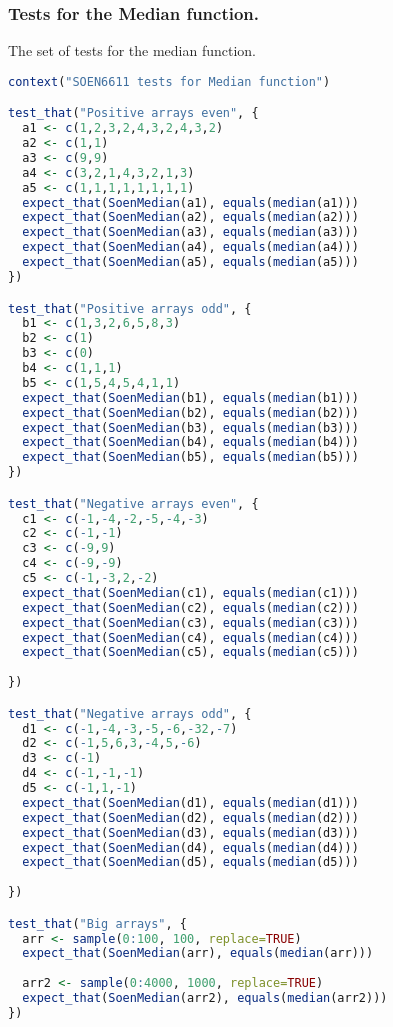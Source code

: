 \documentclass[12pt]{article}
\begin{document}
\subsubsection{Tests for the Median function.}
The set of tests for the median function.
\begin{lstlisting}[language=R]
context("SOEN6611 tests for Median function")

test_that("Positive arrays even", {
  a1 <- c(1,2,3,2,4,3,2,4,3,2)
  a2 <- c(1,1)
  a3 <- c(9,9)
  a4 <- c(3,2,1,4,3,2,1,3)
  a5 <- c(1,1,1,1,1,1,1,1)
  expect_that(SoenMedian(a1), equals(median(a1)))
  expect_that(SoenMedian(a2), equals(median(a2)))
  expect_that(SoenMedian(a3), equals(median(a3)))
  expect_that(SoenMedian(a4), equals(median(a4)))
  expect_that(SoenMedian(a5), equals(median(a5)))
})

test_that("Positive arrays odd", {
  b1 <- c(1,3,2,6,5,8,3)
  b2 <- c(1)
  b3 <- c(0)
  b4 <- c(1,1,1)
  b5 <- c(1,5,4,5,4,1,1)
  expect_that(SoenMedian(b1), equals(median(b1)))
  expect_that(SoenMedian(b2), equals(median(b2)))
  expect_that(SoenMedian(b3), equals(median(b3)))
  expect_that(SoenMedian(b4), equals(median(b4)))
  expect_that(SoenMedian(b5), equals(median(b5)))
})

test_that("Negative arrays even", {
  c1 <- c(-1,-4,-2,-5,-4,-3)
  c2 <- c(-1,-1)
  c3 <- c(-9,9)
  c4 <- c(-9,-9)
  c5 <- c(-1,-3,2,-2)
  expect_that(SoenMedian(c1), equals(median(c1)))
  expect_that(SoenMedian(c2), equals(median(c2)))
  expect_that(SoenMedian(c3), equals(median(c3)))
  expect_that(SoenMedian(c4), equals(median(c4)))
  expect_that(SoenMedian(c5), equals(median(c5)))
  
})

test_that("Negative arrays odd", {
  d1 <- c(-1,-4,-3,-5,-6,-32,-7)
  d2 <- c(-1,5,6,3,-4,5,-6)
  d3 <- c(-1)
  d4 <- c(-1,-1,-1)
  d5 <- c(-1,1,-1)
  expect_that(SoenMedian(d1), equals(median(d1)))
  expect_that(SoenMedian(d2), equals(median(d2)))
  expect_that(SoenMedian(d3), equals(median(d3)))
  expect_that(SoenMedian(d4), equals(median(d4)))
  expect_that(SoenMedian(d5), equals(median(d5)))
  
})

test_that("Big arrays", {
  arr <- sample(0:100, 100, replace=TRUE)
  expect_that(SoenMedian(arr), equals(median(arr)))
  
  arr2 <- sample(0:4000, 1000, replace=TRUE)
  expect_that(SoenMedian(arr2), equals(median(arr2)))
})
\end{lstlisting}
\end{document}
